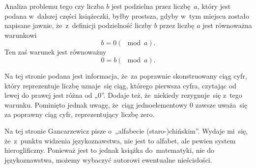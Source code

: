 \documentclass[a4paper,11pt]{article}
\numberwithin{equation}{section}
\begin{document}
\VerSpaceFour





 Analiza problemu tego czy liczba $b$ jest podzielna przez
liczbę~$a$, który jest podana w~dalszej części książeczki, byłby prostsza,
gdyby w~tym miejscu zostało napisane jawnie, że~z~definicji podzielność
liczby $b$ przez liczbę $a$ jest równoważna warunkowi
\begin{equation}
  \label{eq:Gancarzewicz-Arytmetyka-07}
  b = 0 ( \mod a ).
\end{equation}
Ten zaś warunek jest równoważny
\begin{equation}
  \label{eq:Gancarzewicz-Arytmetyka-08}
  0 = b ( \mod a ).
\end{equation}

\VerSpaceFour





\noindent
{} Na tej stronie podana jest informacja, że~za poprawnie
skonstruowany ciąg cyfr, który reprezentuje liczbę uznaje~się ciąg, którego
pierwsza cyfra, czytając od lewej do prawej jest różna od „$0$”.
Dodaje też, że~niekiedy rezygnuje~się z~tego warunku. Pominięto jednak
uwagę, że~ciąg jednoelementowy $0$ zawsze uważa~się za poprawny ciąg cyfr,
reprezentujący liczbę zero.

\VerSpaceFour





\noindent
{} Na tej stronie Gancarzewicz pisze o~„alfabecie (staro-)chińskim”.
Wydaje mi~się, że~z~punktu widzenia językoznawstwa, nie jest to alfabet,
ale pewien system hieroglificzny. Ponieważ jest to jednak książka
do~matematyki, nie do językoznawstwa, możemy wybaczyć autorowi ewentualne
nieścisłości.

\VerSpaceFour

















\newpage


\VerSpaceFive
\end{document}

